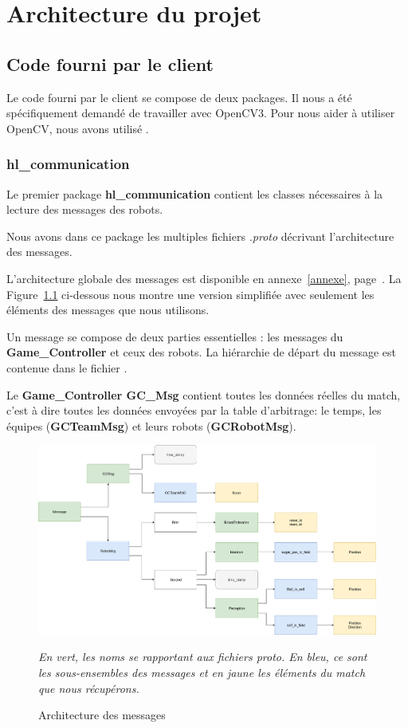 
\chapter{Architecture du projet}

   
\section{Code fourni par le client}

Le code fourni par le client se compose de deux packages. Il 
nous a été spécifiquement demandé de travailler avec OpenCV3. 
Pour nous aider à utiliser OpenCV, nous avons utilisé 
\cite{ref3}.

\subsection{hl\_communication}

Le premier package \textbf{hl\_communication} contient les 
classes nécessaires à la lecture des messages des robots.
\bigskip

Nous avons dans ce package les multiples fichiers 
\textit{.proto} décrivant l'architecture des messages. 

L'architecture globale des messages est disponible en 
annexe~\ref{annexe}, page~\pageref{annexe}. La 
Figure~\ref{fig:message} ci-dessous nous montre une version 
simplifiée avec seulement les éléments des messages que nous 
utilisons.
\bigskip

Un message se compose de deux parties essentielles : les 
messages du \textbf{Game\_Controller} et ceux des robots. La 
hiérarchie de départ du message est contenue dans le fichier 
.
\bigskip

Le \textbf{Game\_Controller GC\_Msg} contient toutes les 
données réelles du match, c'est à dire toutes les données 
envoyées par la table d'arbitrage: le temps, les équipes 
(\textbf{GCTeamMsg}) et leurs robots (\textbf{GCRobotMsg}). 
\bigskip



\begin{figure}[H] 
\centering 
\includegraphics[scale = 0.24]{images/shortmessage.png}
    \caption{Architecture des messages}
    \label{fig:message}
    {\textit{En vert, les noms se rapportant aux fichiers
    proto. En bleu, ce sont les sous-ensembles des messages et
    en jaune les éléments du match que nous récupérons. }}
\end{figure} 



